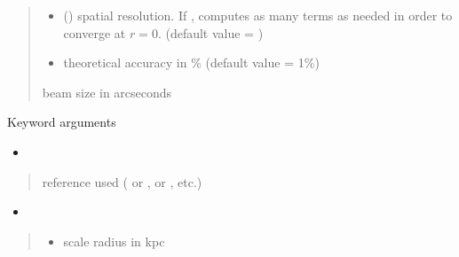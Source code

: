 \documentclass[letterpaper,10pt,english]{sphinxmanual}
\begin{document}
\begin{fulllineitems}
\begin{quote}
\begin{description}
\begin{itemize}
\item {} 
\sphinxAtStartPar
{} () \textendash{} spatial resolution. If ,  computes as many terms as needed in order to converge at \(r=0\). (default value = )

\item {} 
\sphinxAtStartPar
{} \textendash{} theoretical accuracy in \% (default value = 1\%)

\end{itemize}

\sphinxAtStartPar
beam size in arcseconds

\end{description}\end{quote}

\sphinxAtStartPar
Keyword arguments
\begin{itemize}
\item {} 
\sphinxAtStartPar
{}

\end{itemize}
\begin{quote}\begin{description}
\sphinxAtStartPar
{} \textendash{} reference used ( or \sphinxcode{\sphinxupquote{\textquotesingle{}1309.2641\textquotesingle{}}},  or \sphinxcode{\sphinxupquote{\textquotesingle{}1408.0002\textquotesingle{}}}, etc.)

\end{description}\end{quote}
\begin{itemize}
\item {} 
\sphinxAtStartPar
{}

\end{itemize}
\begin{quote}\begin{description}
\begin{itemize}
\item {} 
\sphinxAtStartPar
{} \textendash{} scale radius in kpc


\end{itemize}
\end{description}
\end{quote}
\end{fulllineitems}
\end{document}
